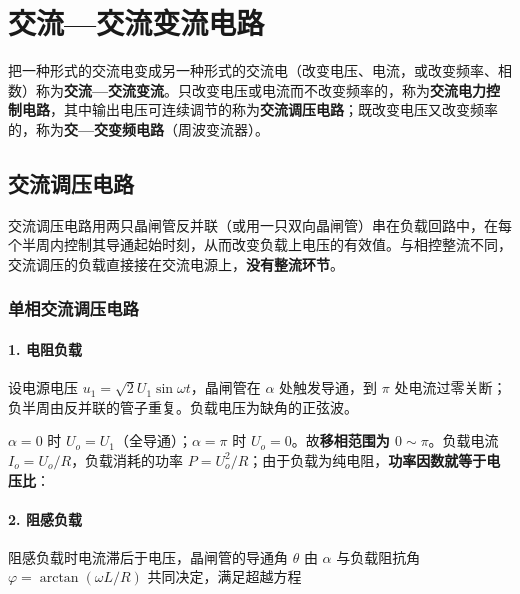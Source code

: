\chapter{交流—交流变流电路}

把一种形式的交流电变成另一种形式的交流电（改变电压、电流，或改变频率、相数）称为\textbf{交流—交流变流}。只改变电压或电流而不改变频率的，称为\textbf{交流电力控制电路}，其中输出电压可连续调节的称为\textbf{交流调压电路}；既改变电压又改变频率的，称为\textbf{交—交变频电路}（周波变流器）。

\section{交流调压电路}

交流调压电路用两只晶闸管反并联（或用一只双向晶闸管）串在负载回路中，在每个半周内控制其导通起始时刻，从而改变负载上电压的有效值。与相控整流不同，交流调压的负载直接接在交流电源上，\textbf{没有整流环节}。

\subsection{单相交流调压电路}

\subsubsection*{1. 电阻负载}

设电源电压 $u_1=\sqrt{2}U_1\sin\omega t$，晶闸管在 $\alpha$ 处触发导通，到 $\pi$ 处电流过零关断；负半周由反并联的管子重复。负载电压为缺角的正弦波。


$\alpha=0$ 时 $U_o=U_1$（全导通）；$\alpha=\pi$ 时 $U_o=0$。故\textbf{移相范围为 $0\sim\pi$}。负载电流 $I_o=U_o/R$，负载消耗的功率 $P=U_o^2/R$；由于负载为纯电阻，\textbf{功率因数就等于电压比}：


\subsubsection*{2. 阻感负载}

阻感负载时电流滞后于电压，晶闸管的导通角 $\theta$ 由 $\alpha$ 与负载阻抗角 $\varphi=\arctan(\omega L/R)$ 共同决定，满足超越方程

